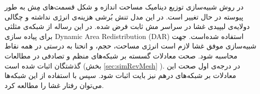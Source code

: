 در روش شبیه‌سازی توزیع دینامیک مساحت
اندازه و شکل قسمت‌های مِش به طور پیوسته در حال تغییر است. در این مدل تنش بُرشی هزینه‌ی انرژی نداشته و چگالی دولایه‌ی لیپیدی غشا در سراسر مش ثابت فرض شده. در این رساله از شبکه‌ی مثلثی برای پیاده سازی 
Dynamic Area Redistribution (DAR)
استفاده شده‌است. جهت شبیه‌سازی موفق غشا لازم است انرژی مساحت، حجم، و انحنا به درستی در همه نقاط محاسبه شود. صحت معادلات گسسته بر شبکه‌های منظم و تصادفی در مطالعات گذشتگان اثبات شده است (بخش 
\ref{sec:simRevMesh}
). در درجه‌ی اول صحت این معادلات بر شبکه‌های درهم نیز بایت اثبات شود. سپس با استفاده از این شبکه‌ها می‌توان رفتار غشا را مطالعه کرد.